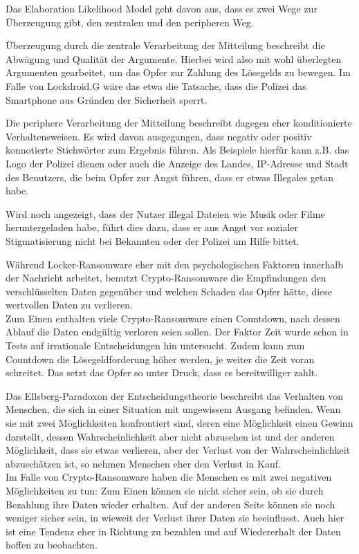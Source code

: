 Das Elaboration Likelihood Model geht davon aus, dass es zwei Wege zur Überzeugung gibt, den zentralen und den peripheren Weg.

Überzeugung durch die zentrale Verarbeitung der Mitteilung beschreibt die Abwägung und Qualität der Argumente. Hierbei wird also mit wohl überlegten Argumenten gearbeitet, um das Opfer zur Zahlung des Lösegelds zu bewegen. Im Falle von \glqq Lockdroid.G\grqq{} wäre das etwa die Tatsache, dass die Polizei das Smartphone \glqq aus Gründen der Sicherheit\grqq{} sperrt.

Die periphere Verarbeitung der Mitteilung beschreibt dagegen eher konditionierte Verhaltensweisen. Es wird davon ausgegangen, dass negativ oder positiv konnotierte Stichwörter zum Ergebnis führen. Als Beispiele hierfür kann z.B. das Logo der Polizei dienen oder auch die Anzeige des Landes, IP-Adresse und Stadt des Benutzers, die beim Opfer zur Angst führen, dass er etwas Illegales getan habe.

Wird noch angezeigt, dass der Nutzer illegal Dateien wie Musik oder Filme heruntergeladen habe, führt dies dazu, dass er aus Angst vor sozialer Stigmatisierung nicht bei Bekannten oder der Polizei um Hilfe bittet.

Während Locker-Ransomware eher mit den psychologischen Faktoren innerhalb der Nachricht arbeitet, benutzt Crypto-Ransomware die Empfindungen den verschlüsselten Daten gegenüber und welchen Schaden das Opfer hätte, diese wertvollen Daten zu verlieren.\\

Zum Einen enthalten viele Crypto-Ransomware einen Countdown, nach dessen Ablauf die Daten endgültig verloren seien sollen. Der Faktor Zeit wurde schon in Tests auf irrationale Entscheidungen hin untersucht. Zudem kann zum Countdown die Lösegeldforderung höher werden, je weiter die Zeit voran schreitet. Das setzt das Opfer so unter Druck, dass es bereitwilliger zahlt.

Das Ellsberg-Paradoxon der Entscheidungstheorie beschreibt das Verhalten von Menschen, die sich in einer Situation mit ungewissem Ausgang befinden. Wenn sie mit zwei Möglichkeiten konfrontiert sind, deren eine Möglichkeit einen Gewinn darstellt, dessen Wahrscheinlichkeit aber nicht abzusehen ist und der anderen Möglichkeit, dass sie etwas verlieren, aber der Verlust von der Wahrscheinlichkeit abzuschätzen ist, so nehmen Menschen eher den Verlust in Kauf. \\
Im Falle von Crypto-Ransomware haben die Menschen es mit zwei negativen Möglichkeiten zu tun: Zum Einen können sie nicht sicher sein, ob sie durch Bezahlung ihre Daten wieder erhalten. Auf der anderen Seite können sie noch weniger sicher sein, in wieweit der Verlust ihrer Daten sie beeinflusst. Auch hier ist eine Tendenz eher in Richtung zu bezahlen und auf Wiedererhalt der Daten hoffen zu beobachten.

